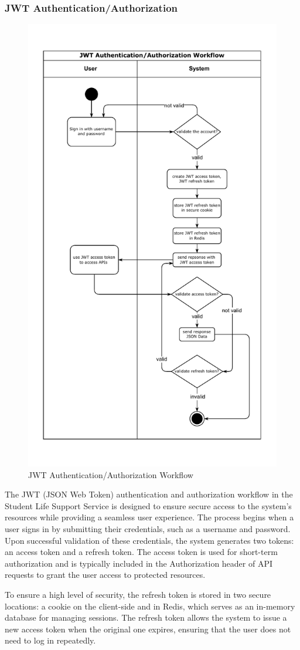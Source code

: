 	\subsubsection{JWT Authentication/Authorization}
	\begin{figure}[H]
		\centering
		\includegraphics[width=0.58\columnwidth]{graphics/jwt-auth.pdf}
		\caption{JWT Authentication/Authorization Workflow}
		\label{fig:jwt-auth}
	\end{figure}
	
	The JWT (JSON Web Token) authentication and authorization workflow in the Student Life Support Service is designed to ensure secure access to the system's resources while providing a seamless user experience. The process begins when a user signs in by submitting their credentials, such as a username and password. Upon successful validation of these credentials, the system generates two tokens: an access token and a refresh token. The access token is used for short-term authorization and is typically included in the Authorization header of API requests to grant the user access to protected resources. 
	
	\noindent To ensure a high level of security, the refresh token is stored in two secure locations: a cookie on the client-side and in Redis, which serves as an in-memory database for managing sessions. The refresh token allows the system to issue a new access token when the original one expires, ensuring that the user does not need to log in repeatedly.
	

